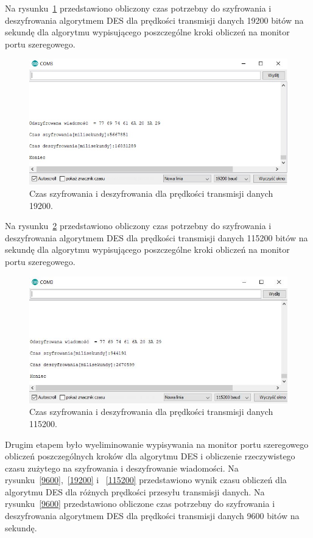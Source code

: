 \documentclass[12p]{article}
\begin{document}
Na rysunku~\ref{19200_print} przedstawiono obliczony czas potrzebny do szyfrowania i deszyfrowania algorytmem DES dla prędkości transmisji danych 19200 bitów na sekundę dla algorytmu wypisującego poszczególne kroki obliczeń na monitor portu szeregowego. 

\begin{figure}[H]
\centering
\includegraphics[width=12cm]{szy_desz_19200_print.jpg}
\caption{Czas szyfrowania i deszyfrowania dla prędkości transmisji danych 19200.}\label{19200_print}
\end{figure}

Na rysunku~\ref{115200_print} przedstawiono obliczony czas potrzebny do szyfrowania i deszyfrowania algorytmem DES dla prędkości transmisji danych 115200 bitów na sekundę dla algorytmu wypisującego poszczególne kroki obliczeń na monitor portu szeregowego.

\begin{figure}[H]
\centering
\includegraphics[width=12cm]{szy_desz_115200_print.jpg}
\caption{Czas szyfrowania i deszyfrowania dla prędkości transmisji danych 115200.}\label{115200_print}
\end{figure}

Drugim etapem było wyeliminowanie wypisywania na monitor portu szeregowego obliczeń poszczególnych kroków dla algorytmu DES i obliczenie rzeczywistego czasu zużytego na szyfrowania i deszyfrowanie wiadomości. Na rysunku~\ref{9600},~\ref{19200} i ~\ref{115200} przedstawiono wynik czasu obliczeń dla algorytmu DES dla różnych prędkości przesyłu transmisji danych. Na rysunku~\ref{9600} przedstawiono obliczone czas potrzebny do szyfrowania i deszyfrowania algorytmem DES dla prędkości transmisji danych 9600 bitów na sekundę.
\end{document}
